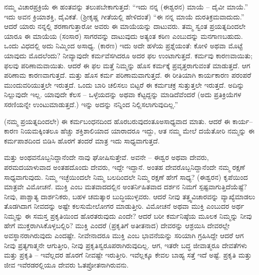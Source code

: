 ನಮ್ಮ ವಿಚಾರಪ್ರಕ್ರಿಯೆ ಈ ಹಂತವನ್ನು ತಲುಪಬೇಕಾಗುತ್ತದೆ: “ಇದು ನನ್ನ (ಈಶ್ವರನ) ಮಾಯೆ – ದೈವೀ ಮಾಯೆ.'' ಇದು ಅವನ ಕ್ರಿಯಾಶಕ್ತಿ, ದೈವಿಕತೆ. (ಶ‍್ರೀಕೃಷ್ಣ ಗೀತೆಯಲ್ಲಿ ಹೇಳಿದಂತೆ) “ಈ ನನ್ನ ಮಾಯೆ ದುರತಿಕ್ರಮವಾದುದು.” ಆದರೆ ಯಾರು ನನ್ನಲ್ಲಿ ಶರಣಾಗುತ್ತಾರೋ ಅವರು ಈ ಮಾಯೆಯನ್ನು ದಾಟುವರು. ತಮ್ಮ ಸ್ವಂತ ಪ್ರಯತ್ನದಿಂದಲೇ ಯಾರೂ ಈ ಮಾಯೆಯ (ಸಂಸಾರ) ಸಾಗರವನ್ನು ದಾಟುವುದು ಅತ್ಯಂತ ಕಠಿಣ ಎಂಬುದನ್ನು ಮನಗಾಣಬಹುದು. ಒಂದು ವಿಧದಲ್ಲಿ ಅದು ನಿಮ್ಮಿಂದ ಅಸಾಧ್ಯ. (ಕಾರಣ) ಇದು ಅದೇ ಹಳೆಯ ಪ್ರಶ್ನೆಯಂತೆ: ಕೋಳಿ ಅಥವಾ ಮೊಟ್ಟೆ ಯಾವುದು ಮೊದಲೆಂದು? ನೀವ್ಯಾವುದೇ ಕರ್ಮವೆಸಗಿದರೂ ಅದರ ಫಲ ಉಂಟಾಗುತ್ತದೆ. ಕರ್ಮವು ಕಾರಣವಾಯಿತು; ಫಲವು ಪರಿಣಾಮವಾಯಿತು. ಆದರೆ ಈ ಫಲ ಮತ್ತೆ ನಿಮ್ಮನ್ನು ಹೊಸ ಕರ್ಮಕ್ಕೆ ಪ್ರವೃತ್ತರಾಗುವಂತೆ ಮಾಡುತ್ತದೆ. ಆಗ ಪರಿಣಾಮ ಕಾರಣವಾಗುತ್ತದೆ. ಮತ್ತು ಹೊಸ ಕರ್ಮ ಪರಿಣಾಮವಾಗುತ್ತದೆ. ಈ ರೀತಿಯಾಗಿ ಕಾರ್ಯಕಾರಣ ಪರಂಪರೆ ಮುಂದುವರಿಯುತ್ತಲೇ ಇರುತ್ತದೆ. ಒಂದು ಬಾರಿ ಚಲಿಸಲು ಬಿಟ್ಟರೆ ಈ ಕರ್ಮಚಕ್ರ ಸುತ್ತುತ್ತಲೇ ಇರುತ್ತದೆ. ಅದಿನ್ನು ನಿಲ್ಲುವುದೇ ಇಲ್ಲ. ಯಾವುದೇ ಕೆಲಸ – ಒಳ್ಳೆಯದನ್ನು ಅಥವಾ ಕೆಟ್ಟದ್ದನ್ನು ಮಾಡಿದೆವೆಂದರೆ (ಅದು ಪ್ರತಿಕ್ರಿಯೆಗಳ ಸರಣಿಯನ್ನೇ ಉಂಟುಮಾಡುತ್ತದೆ.) ಇನ್ನು ಅದನ್ನು ನನ್ನಿಂದ ನಿಲ್ಲಿಸಲಾಗುವುದಿಲ್ಲ.”

(ನಮ್ಮ ಪ್ರಯತ್ನದಿಂದಲೇ) ಈ ಕರ್ಮಬಂಧನದಿಂದ ಹೊರಬರುವುದಂತೂ\break ಅಸಾಧ್ಯವಾದ ಮಾತು. ಆದರೆ ಈ ಕಾರ್ಯ–ಕಾರಣ ನಿಯಮಕ್ಕಿಂತಲೂ ಹೆಚ್ಚು ಶಕ್ತಿಶಾಲಿಯಾದ ಯಾರಾದರೂ ಇದ್ದು, ಆತ ನಮ್ಮ ಮೇಲೆ ದಯೆತೋರಿ ನಮ್ಮನ್ನು ಈ ಕರ್ಮಪಾಶದಿಂದ ಬಿಡಿಸಿ ಹೊರಗೆ ತಂದರೆ ಮಾತ್ರ ಇದು ಸಾಧ್ಯವಾಗುತ್ತದೆ.

ಮತ್ತು ಅಂಥವನೊಬ್ಬನಿದ್ದಾನೆಂದೇ ನಾವು ಘೋಷಿಸುತ್ತೇವೆ. ಅವನೇ – ಈಶ್ವರ ಅಥವಾ ದೇವರು, ಪರಮದಯಾಳುವಾದ ಅಂತಹದೊಂದು ದೇವರು, ಇದ್ದೇ ಇದ್ದಾನೆ. ಅಂತಹ ದೇವರೊಬ್ಬನಿದ್ದಾನೆಂದೇ ನಮ್ಮ ರಕ್ಷಣೆ ಸಾಧ್ಯವಾಗುವುದು. ನಿಮ್ಮ ಇಚ್ಛೆಯಿಂದಲೇ ನಿಮ್ಮ ಬಲದಿಂದಲೇ ನಿಮ್ಮ ರಕ್ಷಣೆ ಹೇಗೆ ಸಾಧ್ಯ? (ಈಶ್ವರನ) ಕೃಪೆಯಿಂದ ಮಾತ್ರವೇ ವಿಮೋಚನೆ. ಮುಕ್ತಿ ಎಂಬ ಮತವಾದದಲ್ಲಿನ ಅಂತರ್ನಿಹಿತವಾದ ದರ್ಶನ ನಿಮಗೆ ಸ್ಪಷ್ಟವಾಗುತ್ತಿದೆಯೆಷ್ಟೆ? ನೀವು, ಪಾಶ್ಚಾತ್ಯ ದಾರ್ಶನಿಕರು, ಬಹಳ ಚಮತ್ಕಾರ ಬುದ್ಧಿಯುಳ್ಳವರು. ಆದರೆ ನೀವು ತತ್ತ್ವವಿಚಾರವನ್ನು ವ್ಯಾಖ್ಯೆಮಾಡಲು ತೊಡಗಿದಾಗ ನೀವದನ್ನು ಅಷ್ಟೇ ಕಲಸುಮೇಲೋಗರ ಮಾಡುತ್ತೀರಿ. ವಿಮೋಚನೆ ಅಥವಾ ಮುಕ್ತಿ ಎಂಬುದರ ಅರ್ಥ ನಿಮ್ಮನ್ನು ಈ ಸಮಸ್ತ ಪ್ರಕೃತಿಯಿಂದ ಹೊರತರುವುದು ಎಂದೇ? ಆದರೆ ಬರೀ ಕರ್ಮನಿಷ್ಠೆಯ ಮೂಲಕ ನಿಮ್ಮನ್ನು ನೀವು ಹೇಗೆ ಮುಕ್ತರಾಗಿಸಿಕೊಳ್ಳಬಲ್ಲಿರಿ? ಮುಕ್ತಿ ಎಂದರೆ (ಪ್ರಕೃತಿಗೆ ಅತೀತನಾದ) ದೇವರನ್ನು ಆಶ್ರಯಿಸಿ ದೇವರಲ್ಲೇ ಅವಸ್ಥಾನರಾಗಿರುವುದು ಎಂದಷ್ಟೇ. ನೀವೇನಾದರೂ ಮುಕ್ತಿ ಎಂಬ ಭಾವನೆಯನ್ನು ಸರಿಯಾಗಿ ಗ್ರಹಿಸಿದ್ದೇ ಆದರೆ ಆಗ ನೀವು ಪ್ರತ್ಯಗಾತ್ಮನೇ ಆಗುತ್ತೀರಿ, ನೀವು ಪ್ರಕೃತಿಸ್ವರೂಪರಾಗಿರುವುದಿಲ್ಲ. ಆಗ, ಇತರೇ ಬದ್ಧ ಜೀವಾತ್ಮರೂ ದೇವತೆಗಳು ಮತ್ತು ಪ್ರಕೃತಿ – ಇವೆಲ್ಲದರ ಹೊರಗೆ ನೀವಷ್ಟೇ ಇರುತ್ತೀರಿ. ಇವೆಲ್ಲಕ್ಕೂ ಕೇವಲ ಬಾಹ್ಯ ಸತ್ತೆ ಇದೆ ಅಷ್ಟೆ. ಪ್ರಕೃತಿ ಮತ್ತು ಜೀವ ಇವೆರಡರಲ್ಲಿಯೂ ದೇವರು ಓತಪ್ರೋತನಾಗಿರುವನು.

